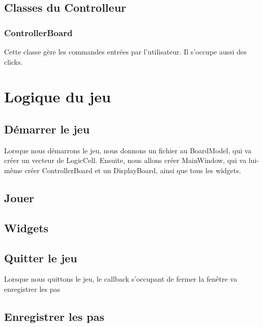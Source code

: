 \documentclass[utf8]{article}
\begin{document}
\begin{large}
\subsection{Classes du Controlleur}
\subsubsection{ControllerBoard}
\par
\indent
Cette classe gère les commandes entrées par l'utilisateur. Il s'occupe aussi des
clicks.
\par

\par
\section{Logique du jeu}
\par
\indent
\subsection{Démarrer le jeu}
\par
\indent
Lorsque nous démarrons le jeu, nous donnons un fichier au BoardModel, qui va
créer un vecteur de LogicCell. Ensuite, nous allons créer MainWindow, qui va
lui-même créer ControllerBoard et un DisplayBoard, ainsi que tous les widgets.


\par
\subsection{Jouer}
\par
\indent
\par

\subsection{Widgets}
\par
\indent
\par
\subsection{Quitter le jeu}
\par
\indent
Lorsque nous quittons le jeu, le callback s'occupant de fermer la fenêtre va enregistrer les pas
\par
\subsection{Enregistrer les pas}
\par
\indent
\par


\end{large}
\end{document}
